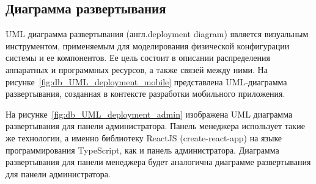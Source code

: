 \subsection{Диаграмма развертывания}

UML диаграмма развертывания (англ.deployment diagram) является визуальным инструментом,
применяемым для моделирования физической конфигурации системы и ее компонентов.
Ее цель состоит в описании распределения аппаратных и программных ресурсов,
а также связей между ними.
На рисунке~\ref{fig:db_UML_deployment_mobile} представлена UML-диаграмма развертывания,
созданная в контексте разработки мобильного приложения.








На рисунке~\ref{fig:db_UML_deployment_admin} изображена UML диаграмма развертывания для панели администратора.
Панель менеджера использует такие же технологии, а именно библиотеку ReactJS (create-react-app) на языке программирования TypeScript,
как и панель администратора.
Диаграмма развертывания для панели менеджера будет аналогична диаграмме развертывания для панели администратора.



